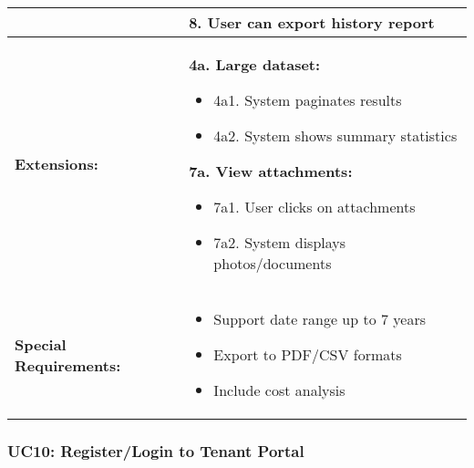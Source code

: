 \documentclass[12pt]{article}
\begin{document}
\begin{tabular}{|p{3cm}|p{11cm}|}
& 8. User can export history report \\
\hline
\textbf{Extensions:} & 
\textbf{4a. Large dataset:}
\begin{itemize}
    \item 4a1. System paginates results
    \item 4a2. System shows summary statistics
\end{itemize}
\textbf{7a. View attachments:}
\begin{itemize}
    \item 7a1. User clicks on attachments
    \item 7a2. System displays photos/documents
\end{itemize} \\
\hline
\textbf{Special Requirements:} & 
\begin{itemize}
    \item Support date range up to 7 years
    \item Export to PDF/CSV formats
    \item Include cost analysis
\end{itemize} \\
\hline
\end{tabular}


\subsubsection{UC10: Register/Login to Tenant Portal}
\end{document}
